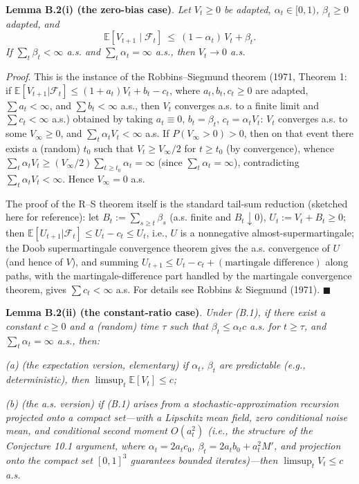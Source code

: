 \documentclass[
  11pt]{article}
\begin{document}
\textbf{Lemma B.2(i) (the zero-bias case)}. \emph{Let \(V_t \ge 0\) be
adapted, \(\alpha_t \in [0,1)\), \(\beta_t \ge 0\) adapted, and}
\[\mathbb{E}[V_{t+1} \mid \mathcal{F}_t] \ \le\ (1-\alpha_t)\,V_t + \beta_t. \tag{B.1}\]
\emph{If \(\sum_t \beta_t < \infty\) a.s. and
\(\sum_t \alpha_t = \infty\) a.s., then \(V_t \to 0\) a.s.}

\emph{Proof}. This is the instance of the Robbins--Siegmund theorem
(1971, Theorem 1: if
\(\mathbb{E}[V_{t+1}|\mathcal{F}_t] \le (1+a_t)V_t + b_t - c_t\), where
\(a_t, b_t, c_t \ge 0\) are adapted, \(\sum a_t < \infty\), and
\(\sum b_t < \infty\) a.s., then \(V_t\) converges a.s. to a finite
limit and \(\sum c_t < \infty\) a.s.) obtained by taking
\(a_t \equiv 0\), \(b_t = \beta_t\), \(c_t = \alpha_t V_t\): \(V_t\)
converges a.s. to some \(V_\infty \ge 0\), and
\(\sum_t \alpha_t V_t < \infty\) a.s. If \(P(V_\infty > 0) > 0\), then
on that event there exists a (random) \(t_0\) such that
\(V_t \ge V_\infty/2\) for \(t \ge t_0\) (by convergence), whence
\(\sum_t \alpha_t V_t \ge (V_\infty/2)\sum_{t \ge t_0}\alpha_t = \infty\)
(since \(\sum_t\alpha_t = \infty\)), contradicting
\(\sum_t\alpha_tV_t < \infty\). Hence \(V_\infty = 0\) a.s.

The proof of the R--S theorem itself is the standard tail-sum reduction
(sketched here for reference): let \(B_t := \sum_{s\ge t}\beta_s\) (a.s.
finite and \(B_t \downarrow 0\)), \(U_t := V_t + B_t \ge 0\); then
\(\mathbb{E}[U_{t+1}|\mathcal{F}_t] \le U_t - c_t \le U_t\), i.e., \(U\)
is a nonnegative almost-supermartingale; the Doob supermartingale
convergence theorem gives the a.s. convergence of \(U\) (and hence of
\(V\)), and summing
\(U_{t+1} \le U_t - c_t + (\text{martingale difference})\) along paths,
with the martingale-difference part handled by the martingale
convergence theorem, gives \(\sum c_t < \infty\) a.s. For details see
Robbins \& Siegmund (1971). \(\blacksquare\)

\textbf{Lemma B.2(ii) (the constant-ratio case)}. \emph{Under (B.1), if
there exist a constant \(c \ge 0\) and a (random) time \(\tau\) such
that \(\beta_t \le \alpha_t c\) a.s. for \(t \ge \tau\), and
\(\sum_t\alpha_t = \infty\) a.s., then:}

\emph{(a) (the expectation version, elementary) if \(\alpha_t\),
\(\beta_t\) are predictable (e.g., deterministic), then
\(\limsup_t \mathbb{E}[V_t] \le c\);}

\emph{(b) (the a.s. version) if (B.1) arises from a
stochastic-approximation recursion projected onto a compact set---with a
Lipschitz mean field, zero conditional noise mean, and conditional
second moment \(O(a_t^2)\) (i.e., the structure of the Conjecture 10.1
argument, where \(\alpha_t = 2a_tc_0\), \(\beta_t = 2a_tb_0 + a_t^2M'\),
and projection onto the compact set \([0,1]^3\) guarantees bounded
iterates)---then \(\limsup_t V_t \le c\) a.s.}
\end{document}

